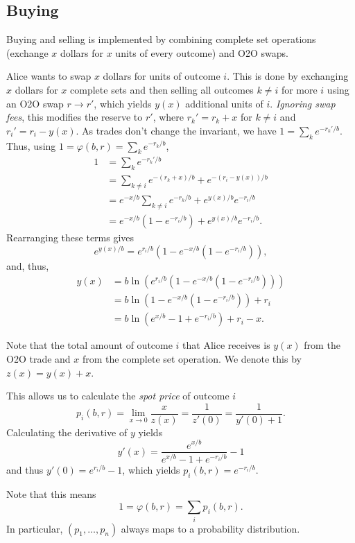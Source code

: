 \documentclass[12pt]{article}
\begin{document}
\subsection{Buying}

Buying and selling is implemented by combining complete set operations (exchange $x$ dollars for $x$ units of every outcome) and O2O swaps.

Alice wants to swap $x$ dollars for units of outcome $i$. This is done by exchanging $x$ dollars for $x$ complete sets and then selling all outcomes $k \neq i$ for more $i$ using an O2O swap $r \rightarrow r'$, which yields $y(x)$ additional units of $i$. \emph{Ignoring swap fees}, this modifies the reserve to $r'$, where $r_k' = r_k + x$ for $k \neq i$ and $r_i' = r_i - y(x)$. As trades don't change the invariant, we have $1 = \sum_k e^{-r_k'/b}$. Thus, using $1 = \varphi(b, r) = \sum_k e^{-r_k/b}$,
\begin{align*}
    1 &= \sum_k e^{-r_k'/b} \\
    &= \sum_{k \neq i} e^{-(r_k + x)/b} + e^{-(r_i-y(x))/b} \\
    &= e^{-x/b} \sum_{k \neq i} e^{-r_k/b} + e^{y(x)/b} e^{-r_i/b} \\
    &= e^{-x/b} (1 - e^{-r_i/b}) + e^{y(x)/b} e^{-r_i/b}.
\end{align*}
Rearranging these terms gives
\[
    e^{y(x)/b} = e^{r_i/b} (1 - e^{-x/b}(1 - e^{-r_i/b})),
\]
and, thus,
\begin{align*}
    y(x) &= b \ln(e^{r_i/b} (1 - e^{-x/b}(1 - e^{-r_i/b}))) \\
    &= b \ln (1 - e^{-x/b}(1 - e^{-r_i/b})) + r_i \\
    &= b \ln (e^{x/b} - 1 + e^{-r_i/b}) + r_i - x.
\end{align*}

Note that the total amount of outcome $i$ that Alice receives is $y(x)$ from the O2O trade and $x$ from the complete set operation. We denote this by $z(x) = y(x) + x$.

This allows us to calculate the \emph{spot price} of outcome $i$
\[
    p_i(b, r) = \lim_{x \rightarrow 0} \frac{x}{z(x)} = \frac{1}{z'(0)} = \frac{1}{y'(0) + 1}.
\]
Calculating the derivative of $y$ yields
\[
    y'(x) = \frac{e^{x/b}}{e^{x/b} - 1 + e^{-r_i/b}} - 1
\]
and thus $y'(0) = e^{r_i/b} - 1$, which yields $p_i(b, r) = e^{-r_i/b}$.

Note that this means
\[
    1 = \varphi(b, r) = \sum_i p_i(b, r).
\]
In particular, $(p_1, \ldots, p_n)$ always maps to a probability distribution.
\end{document}

